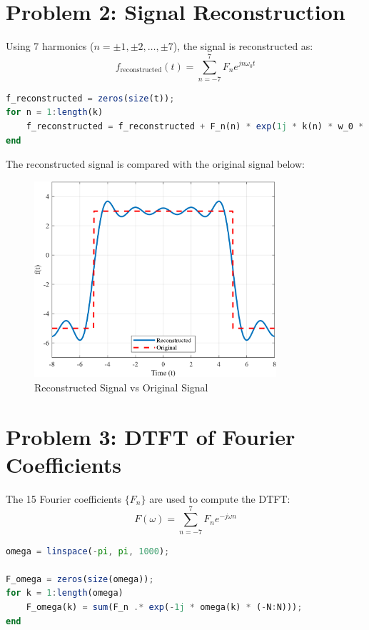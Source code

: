 \documentclass[12pt]{article}
\begin{document}
\newpage
\section*{Problem 2: Signal Reconstruction}
Using 7 harmonics ($n = \pm 1, \pm 2, \dots, \pm 7$), the signal is reconstructed as:
\[ f_{\text{reconstructed}}(t) = \sum_{n=-7}^{7} F_n e^{j n \omega_0 t} \]

\begin{lstlisting}[language=Octave, caption=MATLAB Script to Reconstruct Signal]
f_reconstructed = zeros(size(t));
for n = 1:length(k)
    f_reconstructed = f_reconstructed + F_n(n) * exp(1j * k(n) * w_0 * t);
end
\end{lstlisting}

\vspace{1cm}
The reconstructed signal is compared with the original signal below:

\begin{figure}[H]
    \centering
    \includegraphics[width=0.8\textwidth]{f_reconstructed.png}
    \caption{Reconstructed Signal vs Original Signal}
\end{figure}


\newpage
\section*{Problem 3: DTFT of Fourier Coefficients}
The 15 Fourier coefficients $\{F_n\}$ are used to compute the DTFT:
\[ F(\omega) = \sum_{n=-7}^{7} F_n e^{-j \omega n} \]

\begin{lstlisting}[language=Octave, caption=MATLAB Script to Compute DTFT]
omega = linspace(-pi, pi, 1000);

F_omega = zeros(size(omega));
for k = 1:length(omega)
    F_omega(k) = sum(F_n .* exp(-1j * omega(k) * (-N:N)));
end
\end{lstlisting}
\end{document}
